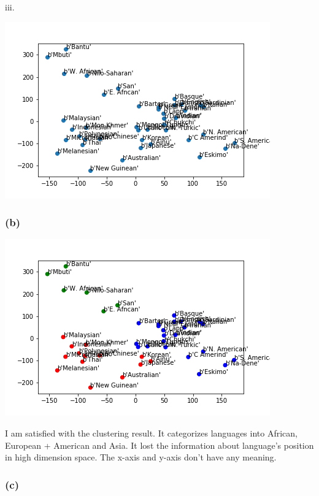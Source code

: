\documentclass[12pt]{article}
\begin{document}
{\medskip
iii.

\includegraphics[scale=1]{P4/scatter.png}

\subsubsection*{(b)}
\includegraphics[scale=1]{P4/3-means.png}

I am satisfied with the clustering result. It categorizes languages into African, European + American and Asia. It lost the information about language's position in high dimension space. The x-axis and y-axis don't have any meaning.

\subsubsection*{(c)}

}
\end{document}
